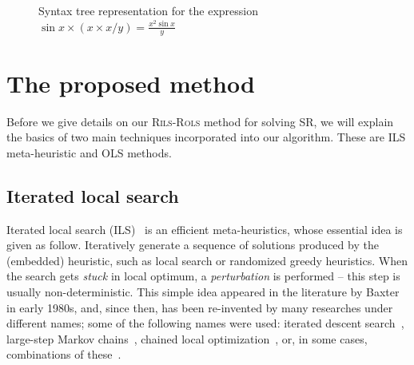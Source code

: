 \documentclass[a4paper,12pt]{elsarticle}
\begin{document}
	\begin{figure}[!ht]
		\centering
		
		\caption{Syntax tree representation for the expression $\sin x \times   ( x \times  x / y  )  = \frac{x^2 \sin x }{y}$}
		\label{fig:syntax-tree-example}
	\end{figure}
	
	
	
	\section{The proposed method}\label{sec:rils}
	Before we give details on our \textsc{Rils}-\textsc{Rols}  method for solving SR, we will explain the basics of two main techniques incorporated into our algorithm. These are ILS meta-heuristic and OLS methods. 
	
	\subsection{Iterated local search}
	Iterated local search (ILS)~\cite{lourencco2003iterated} is an efficient meta-heuristics, whose essential idea is given as follow. Iteratively generate a sequence of solutions produced by the (embedded) heuristic, such as local search or randomized greedy heuristics. When the search gets \emph{stuck} in local optimum, a \emph{perturbation} is performed -- this step is usually non-deterministic. This simple idea appeared in the literature by Baxter~\cite{baxter1981local} in early 1980s, and, since then, has been  re-invented by many researches under different names; some of the following names were used: iterated descent search~\cite{baum1998iterated}, large-step
	Markov chains~\cite{martin1991large}, chained local optimization~\cite{martin1996combining}, or, in some cases, combinations of these~\cite{applegate2003chained}. 
	
\end{document}

